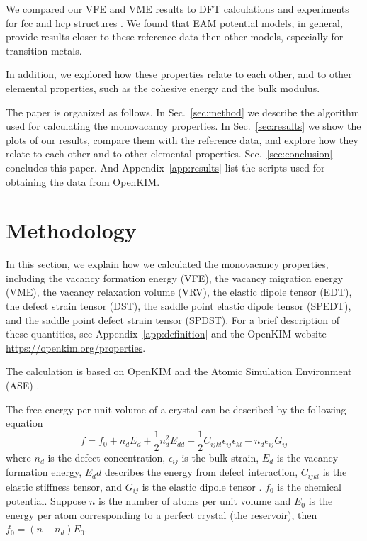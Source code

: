 \documentclass[%
 reprint,
 amsmath,amssymb,
 aps,
]{revtex4-1}
\begin{document}
We compared our VFE and VME results to DFT calculations and experiments for fcc and hcp structures \cite{angsten2014elemental}.
We found that EAM potential models, in general, provide results closer to these reference data then other models, especially for transition metals.

In addition, we explored how these properties relate to each other, and to other elemental properties, such as the cohesive energy and the bulk modulus.

The paper is organized as follows.
In Sec.~\ref{sec:method} we describe the algorithm used for calculating the monovacancy properties.
In Sec.~\ref{sec:results} we show the plots of our results, compare them with the reference data, and explore how they relate to each other and to other elemental properties.
Sec.~\ref{sec:conclusion} concludes this paper.
And Appendix~\ref{app:results} list the scripts used for obtaining the data from OpenKIM.

\section{\label{sec:method}Methodology}

In this section, we explain how we calculated the monovacancy properties, including the vacancy formation energy (VFE), the vacancy migration energy (VME), the vacancy relaxation volume (VRV), the elastic dipole tensor (EDT), the defect strain tensor (DST), the saddle point elastic dipole tensor (SPEDT), and the saddle point defect strain tensor (SPDST).
For a brief description of these quantities, see Appendix~\ref{app:definition} and the OpenKIM website \url{https://openkim.org/properties}.

The calculation is based on OpenKIM and the Atomic Simulation Environment (ASE) \cite{bahn2002object}.

The free energy per unit volume of a crystal can be described by the following equation
\begin{equation}\label{eq:f}
f = f_0 + n_dE_d + \frac{1}{2}n_d^2E_{dd} + \frac{1}{2}C_{ijkl}\epsilon_{ij}\epsilon_{kl} - n_d\epsilon_{ij}G_{ij}
\end{equation}
where $n_d$ is the defect concentration, $\epsilon_{ij}$ is the bulk strain, $E_d$ is the vacancy formation energy, $E_dd$ describes the energy from defect interaction, $C_{ijkl}$ is the elastic stiffness tensor, and $G_{ij}$ is the elastic dipole tensor \cite{freedman2009elastic}.
$f_0$ is the chemical potential.
Suppose $n$ is the number of atoms per unit volume and $E_0$ is the energy per atom corresponding to a perfect crystal (the reservoir), then $f_0 = (n - n_d) E_0$.
\end{document}
